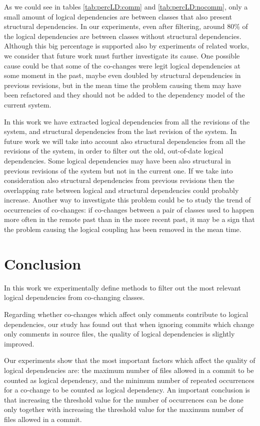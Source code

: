 \documentclass[a4paper,twoside]{article}
\begin{document}
As we could see in tables \ref{tab:percLD:comm} and \ref{tab:percLD:nocomm}, only a small amount of logical dependencies are between classes that also present structural dependencies.  In our experiments, even after filtering, around 80\% of the logical dependencies are between classes without structural dependencies. Although this big percentage is supported also by experiments of related works, we consider that future work must further investigate its cause. One possible cause could be that some of the co-changes were legit logical dependencies at some moment in the past, maybe even doubled by structural dependencies in previous revisions, but in the mean time the problem causing them may have been refactored and they should not be added to the dependency model of the current system.  

In this work we have extracted logical dependencies from all the revisions of the system, and structural dependencies from the last revision of the system. In future work we will take into account also structural dependencies from all the revisions of the system, in order to filter out the old, out-of-date logical dependencies.  Some logical dependencies may have been also structural in previous revisions of the system but not in the current one. If we take into consideration also structural dependencies from previous revisions then the overlapping rate between logical and structural dependencies could probably increase. Another way to investigate this problem could be to study the trend of occurrencies of co-changes: if co-changes between a pair of classes used to happen more often in the remote past than in the more recent past, it may be a sign that the problem causing the logical coupling has been removed in the mean time. 


   


\section{Conclusion}
\label{sec:Conclusion}
   
In this work we experimentally define methods to filter out the most relevant logical dependencies from co-changing classes. 

Regarding whether co-changes which affect only comments contribute to logical dependencies, our study has found out that when ignoring commits which change only comments in source files, the quality of logical dependencies is slightly improved.

Our experiments show that the most important factors which affect the quality of logical dependencies are: the maximum number of files allowed in a commit to be counted as logical dependency, and the minimum number of repeated occurrences for a co-change to be counted as logical dependency. An important conclusion is that increasing the threshold value for the number of occurrences can be done only together with increasing the threshold value for the maximum number of files allowed in a commit.

 

{\small
}
 
\end{document}
